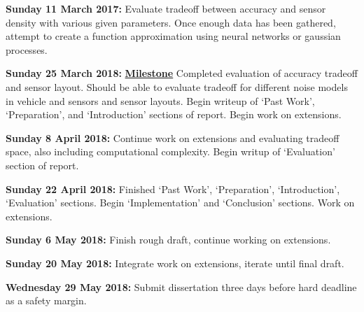 \documentclass[12pt]{article}
\begin{document}
\textbf{Sunday 11 March 2017:} Evaluate tradeoff between accuracy and sensor density with various given parameters. Once enough data has been gathered, attempt to create a function approximation using neural networks or gaussian processes.

\textbf{Sunday 25 March 2018:} \textbf{\underline{Milestone}} Completed evaluation of accuracy tradeoff and sensor layout. Should be able to evaluate tradeoff for different noise models in vehicle and sensors and sensor layouts. Begin writeup of `Past Work', `Preparation', and `Introduction' sections of report. Begin work on extensions.

\textbf{Sunday 8 April 2018:} Continue work on extensions and evaluating tradeoff space, also including computational complexity. Begin writup of `Evaluation' section of report.

\textbf{Sunday 22 April 2018:} Finished `Past Work', `Preparation', `Introduction', `Evaluation' sections. Begin `Implementation' and `Conclusion' sections. Work on extensions.

\textbf{Sunday 6 May 2018:} Finish rough draft, continue working on extensions.

\textbf{Sunday 20 May 2018:} Integrate work on extensions, iterate until final draft.

\textbf{Wednesday 29 May 2018:} Submit dissertation three days before hard deadline as a safety margin.



\printbibliography
\end{document}
